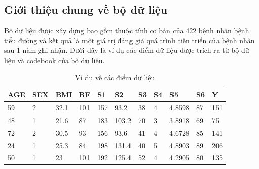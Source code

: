 \documentclass[runningheads]{llncs}
\begin{document}
\subsection{Giới thiệu chung về bộ dữ liệu}
Bộ dữ liệu được xây dựng bao gồm  thuộc tính cơ bản của 422 bệnh nhân bệnh tiểu đường và kết quả là một giá trị đáng giá quá trình tiến triển của bệnh nhân sau 1 năm ghi nhận. Dưới đây là ví dụ các điểm dữ liệu được trích ra từ bộ dữ liệu và codebook của bộ dữ liệu.
\begin{table}
	\setlength{\tabcolsep}{0.5em}
	\renewcommand{\arraystretch}{1.4}
	\begin{center}
		\caption{Ví dụ về các điểm dữ liệu}\label{tab1}
		\begin{tabular}{|p{0.75cm}|p{0.75cm}|p{0.75cm}|p{0.75cm}|p{0.75cm}|p{0.75cm}|p{0.75cm}|p{0.75cm}|p{1cm}|p{0.75cm}|p{0.75cm}|}
			\hline
			\textbf{AGE}&\textbf{SEX}&\textbf{BMI}&\textbf{BF}&\textbf{S1}&\textbf{S2}&\textbf{S3}&\textbf{S4}&\textbf{S5}&\textbf{S6}&\textbf{Y}\\
			\hline
			59&2&32.1&101&157&93.2&38&4&4.8598&87&151\\
			\hline
			48&1&21.6&87&183&103.2&70&3&3.8918&69&75\\
			\hline
			72&2&30.5&93&156&93.6&41&4&4.6728&85&141\\
			\hline
			24&1&25.3&84&198&131.4&40&5&4.8903&89&206\\
			\hline
			50&	1	&23&	101&	192&	125.4&	52&	4&	4.2905&	80&	135\\
			\hline
		\end{tabular}
	\end{center}
\end{table}
\end{document}
